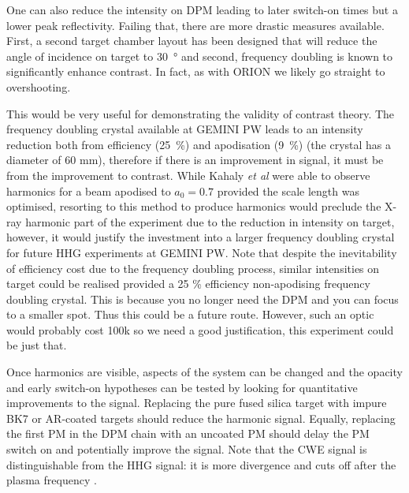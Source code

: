One can also reduce the intensity on DPM leading to later switch-on times but a lower peak reflectivity. Failing that, there are more drastic measures available. First, a second target chamber layout has been designed that will reduce the angle of incidence on target to \qty{30}{\degree} and second, frequency doubling is known to significantly enhance contrast. In fact, as with ORION we likely go straight to overshooting. 

This would be very useful for demonstrating the validity of contrast theory. The frequency doubling crystal available at GEMINI PW leads to an intensity reduction both from efficiency (\qty{25}{\%}) and apodisation (\qty{9}{\%}) (the crystal has a diameter of 60 mm), therefore if there is an improvement in signal, it must be from the improvement to contrast. While Kahaly \textit{et al} were able to observe harmonics for a beam apodised to $a_0 = 0.7$ provided the scale length was optimised, resorting to this method to produce harmonics would preclude the X-ray harmonic part of the experiment due to the reduction in intensity on target, however, it would justify the investment into a larger frequency doubling crystal for future HHG experiments at GEMINI PW. Note that despite the inevitability of efficiency cost due to the frequency doubling process, similar intensities on target could be realised provided a 25 \% efficiency non-apodising frequency doubling crystal. This is because you no longer need the DPM and you can focus to a smaller spot. Thus this could be a future route. However, such an optic would probably cost 100k so we need a good justification, this experiment could be just that.

Once harmonics are visible, aspects of the system can be changed and the opacity and early switch-on hypotheses can be tested by looking for quantitative improvements to the signal. Replacing the pure fused silica target with impure BK7 or AR-coated targets should reduce the harmonic signal. Equally, replacing the first PM in the DPM chain with an uncoated PM should delay the PM switch on and potentially improve the signal. Note that the CWE signal is distinguishable from the HHG signal: it is more divergence and cuts off after the plasma frequency \cite{kahalyDirectObservationDensityGradient2013}.



